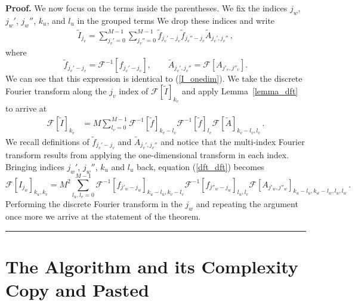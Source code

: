 \documentclass[12pt]{CSUNthesis}
\newenvironment{proof}[1][Proof]{\noindent\textbf{#1.} }{\newline \hspace*{\textwidth}\hspace*{-0,4cm} \rule{0.5em}{0.5em} \vspace{0,2cm}}
\def\calF{\mathcal{F}}
\begin{document}
\begin{proof}
We now focus on the terms inside the parentheses. We fix the indices $j_w$, $j_w'$, $j_w''$, $k_{u}$, and $l_{u}$ in the grouped terms We drop these indices and write
\begin{align*}
\tilde{I}_{j_v} =  \sum_{j_v'=0}^{M-1} \sum_{j_v''=0}^{M-1} \tilde{f}_{j_v'-j_v} \tilde{f}_{j_v''-j_v} \tilde{A}_{j_v',j_v''}\, , 
\end{align*}
where 
\begin{equation*}
\tilde{f}_{j_v'-j_v} = \calF^{-1}[f_{j_v'-j_v}],\qquad 
\tilde{A}_{j_v',j_v''} =  \calF[A_{j'_{v},j''_{v}}].
\end{equation*}
We can see that this expression is identical to (\ref{I_onedim}). We take the discrete Fourier transform along the $j_v$ index of $\calF[\tilde{I}]_{k_v}$ and apply Lemma~\ref{lemma_dft} to arrive at
\begin{align}
\label{dft_dft}
\calF[\tilde{I}]_{k_v} &= M \sum_{l_{v}=0}^{M-1} \calF^{-1}[ \tilde{f}]_{k_{v}-l_{v}} \calF^{-1}[\tilde{f}]_{l_{v}} \calF[\tilde{A}]_{k_{v}-l_{v},l_{v}}\, .
\end{align}
We recall definitions of $\tilde{f}_{j_v'-j_v}$ and $\tilde{A}_{j_v',j_v''}$ and notice that the 
multi-index  Fourier transform results from applying the one-dimensional transform in each index. 
Bringing indices
$j_w'$, $j_w''$, $k_{u}$ and $l_{u}$ back, equation (\ref{dft_dft}) becomes
\begin{equation*}
\calF[I_{j_w}]_{k_u,k_v} = M^2 \sum_{l_u,l_v=0}^{M-1} \calF^{-1}[f_{j'_w-j_w}]_{k_u-l_u,k_v-l_v} \calF^{-1}[f_{j''_w-j_w}]_{l_u,l_v} \calF[A_{j'_w,j''_w}]_{k_u-l_u,k_w-l_w,l_u,l_w}\, .
\end{equation*}
Performing the discrete Fourier transform in the $j_w$ and repeating the argument once more we arrive at the statement of the theorem.
\end{proof}


\section{The Algorithm and its Complexity Copy and Pasted}
\label{sec:algorithm}
\end{document}
